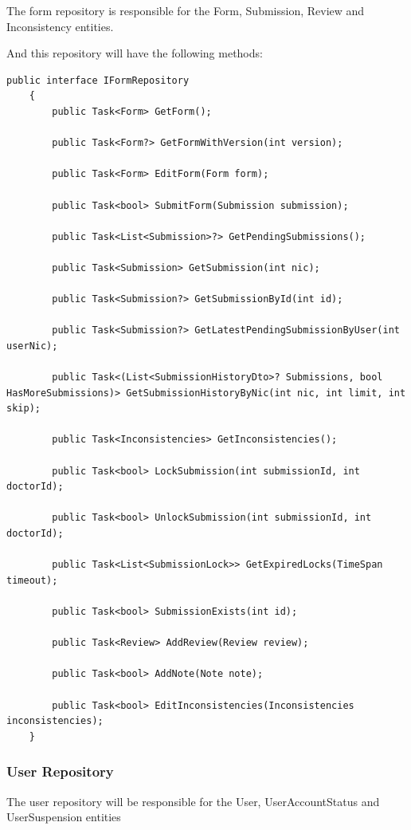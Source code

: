 The form repository is responsible for the Form, Submission, Review and Inconsistency entities.

And this repository will have the following methods:

\begin{lstlisting}[style=sharpc]
	public interface IFormRepository
	{
		public Task<Form> GetForm();
		
		public Task<Form?> GetFormWithVersion(int version);
		
		public Task<Form> EditForm(Form form);
		
		public Task<bool> SubmitForm(Submission submission);
		
		public Task<List<Submission>?> GetPendingSubmissions();
		
		public Task<Submission> GetSubmission(int nic);
		
		public Task<Submission?> GetSubmissionById(int id);
		
		public Task<Submission?> GetLatestPendingSubmissionByUser(int userNic);
		
		public Task<(List<SubmissionHistoryDto>? Submissions, bool HasMoreSubmissions)> GetSubmissionHistoryByNic(int nic, int limit, int skip);
		
		public Task<Inconsistencies> GetInconsistencies();
		
		public Task<bool> LockSubmission(int submissionId, int doctorId);
		
		public Task<bool> UnlockSubmission(int submissionId, int doctorId);
		
		public Task<List<SubmissionLock>> GetExpiredLocks(TimeSpan timeout);
		
		public Task<bool> SubmissionExists(int id);
		
		public Task<Review> AddReview(Review review);
		
		public Task<bool> AddNote(Note note);
		
		public Task<bool> EditInconsistencies(Inconsistencies inconsistencies);
	}
\end{lstlisting}

\subsubsection{User Repository}

The user repository will be responsible for the User, UserAccountStatus and UserSuspension entities

